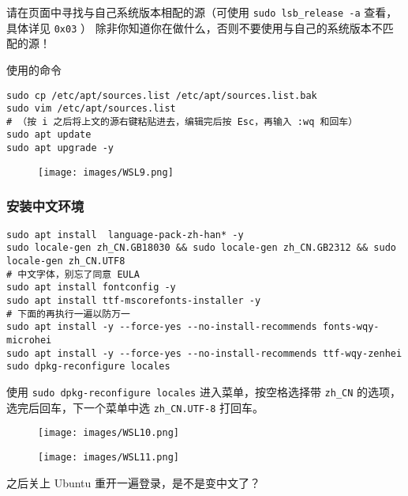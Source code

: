 \begin{WARNING}{}{}
 请在页面中寻找与自己系统版本相配的源（可使用 \texttt{sudo lsb_release -a} 查看，具体详见 \texttt{0x03} ）   除非你知道你在做什么，否则不要使用与自己的系统版本不匹配的源！     
\end{WARNING}


使用的命令

\begin{verbatim}
sudo cp /etc/apt/sources.list /etc/apt/sources.list.bak
sudo vim /etc/apt/sources.list
# （按 i 之后将上文的源右键粘贴进去，编辑完后按 Esc，再输入 :wq 和回车）
sudo apt update
sudo apt upgrade -y
\end{verbatim}

\begin{figure}[h]
\centering
\texttt{[image: images/WSL9.png]} 

\end{figure}

\subsubsection{安装中文环境}

\begin{verbatim}
sudo apt install  language-pack-zh-han* -y
sudo locale-gen zh_CN.GB18030 && sudo locale-gen zh_CN.GB2312 && sudo locale-gen zh_CN.UTF8
# 中文字体，别忘了同意 EULA
sudo apt install fontconfig -y
sudo apt install ttf-mscorefonts-installer -y
# 下面的再执行一遍以防万一
sudo apt install -y --force-yes --no-install-recommends fonts-wqy-microhei
sudo apt install -y --force-yes --no-install-recommends ttf-wqy-zenhei
sudo dpkg-reconfigure locales
\end{verbatim}

使用 \texttt{sudo dpkg-reconfigure locales} 进入菜单，按空格选择带 \texttt{zh_CN} 的选项，选完后回车，下一个菜单中选 \texttt{zh_CN.UTF-8} 打回车。

\begin{figure}[h]
\centering
\texttt{[image: images/WSL10.png]} 

\end{figure}

\begin{figure}[h]
\centering
\texttt{[image: images/WSL11.png]} 

\end{figure}

 之后关上 Ubuntu 重开一遍登录，是不是变中文了？

